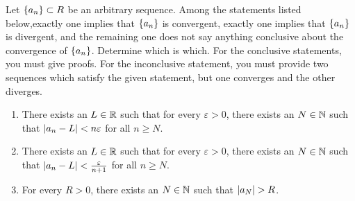 \documentclass[12pt]{article}
\begin{document}
\begin{problem}
    Let $\set{a_{n}} \subset R$ be an arbitrary sequence.
    Among the statements listed below,exactly one implies that $\set{a_{n}}$ is convergent, exactly one implies that $\set{a_{n}}$ is divergent, and the remaining one does not say anything conclusive about the convergence of $\set{a_{n}}$.
    Determine which is which.
    For the conclusive statements, you must give proofs.
    For the inconclusive statement, you must provide two sequences which satisfy the given statement, but one converges and the other diverges.
    \begin{enumerate}[label=(\arabic*)]
        \item There exists an $L \in \mathbb{R}$ such that for every $\varepsilon > 0$, there exists an $N \in \mathbb{N}$ such that $\abs{a_{n} - L} < n \varepsilon$ for all $n \geq N$.
        \item There exists an $L \in \mathbb{R}$ such that for every $\varepsilon > 0$, there exists an $N \in \mathbb{N}$ such that $\abs{a_{n} - L} < \frac{\varepsilon}{n + 1}$ for all $n \geq N$.
        \item For every $R > 0$, there exists an $N \in \mathbb{N}$ such that $\abs{a_{N}} > R$.
    \end{enumerate}
\end{problem}
\end{document}
